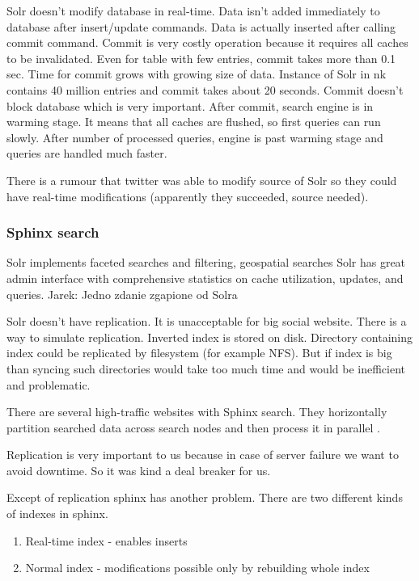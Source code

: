 \documentclass[10pt,a4paper]{article}
\newcommand{\jarek}[1]{\noindent\colorbox{myYellow}{Jarek: #1}}
\begin{document}
Solr doesn't modify database in real-time. Data isn't added immediately to database after insert/update commands. Data is actually inserted after calling commit command. Commit is very costly operation because it requires all caches to be invalidated. Even for table with few entries, commit takes more than 0.1 sec. Time for commit grows with growing size of data. Instance of Solr in nk contains 40 million entries and commit takes about 20 seconds. Commit doesn't block database which is very important. After commit, search engine is in warming stage. It means that all caches are flushed, so first queries can run slowly. After number of processed queries, engine is past warming stage and queries are handled much faster.

There is a rumour that twitter was able to modify source of Solr so they could have real-time modifications (apparently they succeeded, source needed).

\subsubsection{Sphinx search}

Solr implements faceted searches and filtering, geospatial searches Solr has great admin interface with comprehensive statistics on cache utilization, updates, and queries. \jarek{Jedno zdanie zgapione od Solra}

Solr doesn't have replication. It is unacceptable for big social website.
There is a way to simulate replication. Inverted index is stored on disk. Directory containing index could be replicated by filesystem (for example NFS). But if index is big than syncing such directories would take too much time and would be inefficient and problematic.

There are several high-traffic websites with Sphinx search. They horizontally partition searched data across search nodes and then process it in parallel \cite{SPHINXPARAL}.

Replication is very important to us because in case of server failure we want to avoid downtime. So it was kind a deal breaker for us.

Except of replication sphinx has another problem. There are two different kinds of indexes in sphinx.
\begin{enumerate}
\item Real-time index - enables inserts
\item Normal index - modifications possible only by rebuilding whole index
\end{enumerate}
\end{document}

